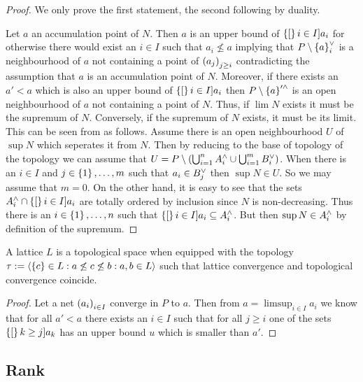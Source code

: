 \documentclass[8pt,a4paper]{article}
\begin{document}
\begin{proof}
    We only prove the first statement, the second following by duality.
    
    Let $a$ an accumulation point of $N$. Then $a$ is an upper bound of $\set[i\in I]{a_i}$ for otherwise there would exist an $i\in I$ such that $a_i\not\leq a$ implying that $P\setminus \set{a_i}^{\join}$ is a neighbourhood of $a$ not containing a point of $\net[j\geq i]{a_j}$ contradicting the assumption that $a$ is an accumulation point of $N$. Moreover, if there exists an $a'<a$ which is also an upper bound of $\set[i\in I]{a_i}$ then $P\setminus\set{a'}^{\meet}$ is an open neighbourhood of $a$ not containing a point of $N$. Thus, if $\lim{N}$ exists it must be the supremum of $N$. Conversely, if the supremum of $N$ exists, it must be its limit. This can be seen from as follows. Assume there is an open neighbourhood $U$ of $\sup{N}$ which seperates it from $N$. Then by reducing to the base of topology of the  topology we can assume that $U=P\setminus(\bigcup_{i=1}^n{A_i^{\wedge}}\cup\bigcup_{i=1}^m{B_i^{\vee}})$. When there is an $i\in I$ and $j\in\set{1,\ldots,m}$ such that $a_i\in B_j^{\vee}$ then $\sup{N}\in U$. So we may assume that $m=0$. On the other hand, it is easy to see that the sets $A_i^{\meet}\setmeet\set[i\in I]{a_i}$ are totally ordered by inclusion since $N$ is non-decreasing. Thus there is an $i\in\set{1,\ldots,n}$ such that $\set[i\in I]{a_i}\setleq A_i^{\meet}$. But then $\sup{N}\in A_i^{\wedge}$ by definition of the supremum.
\end{proof}




\begin{lemma}
    A lattice $L$ is a topological space when equipped with the topology
    $\tau:=\gen{\set{c\in L: a\not\leq c\not\leq b}:a,b\in L}$ such that lattice convergence and topological convergence coincide.
\end{lemma}

\begin{proof}
    Let a net $\net[i\in I]{a_i}$ converge in $P$ to $a$. Then from $a=\limsup_{i\in I}{a_i}$ we know that for all $a'<a$ there exists an $i\in I$ such that for all $j\geq i$ one of the sets $\set[k\geq j]{a_k}$ has an upper bound $u$ which is smaller than $a'$.
\end{proof}



\subsection{Rank}
\end{document}

